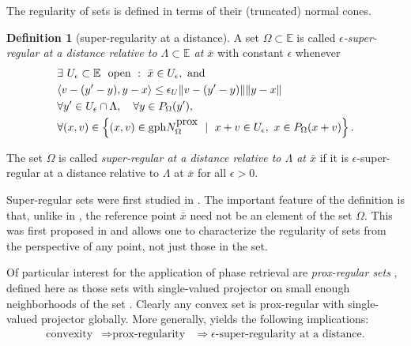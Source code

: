 \documentclass[12pt]{article}
\theoremstyle{definition}
\newtheorem{definition}{Definition}
\renewcommand{\equiv}{:=}
\newcommand{\Ebb}{\mathbb{E}}
\newcommand{\gph}{\mathrm{gph} }
\newcommand{\pncone}[1]{N^{\mbox{\rm prox}}_{#1}} %
\begin{document}
 	 The regularity of sets is defined in terms of their (truncated) normal cones.
\begin{definition}[super-regularity at a distance]\label{definition: super-reg+}
	A set $\Omega\subset \Ebb$ is called {\em $\epsilon$-super-regular at a distance relative
	to $\Lambda\subset \Ebb$ at $\bar x$} with constant $\epsilon$ whenever	\begin{align}\label{eq:ele.subreg}
    &\exists ~U_\epsilon\subset\mathbb{E}~\mbox{ open}~ :~ \bar x\in U_\epsilon,\mbox{ and }\\
    & \langle{v - (y'-y),y - x\rangle}\leq
    \epsilon_U\|v - (y'-y)\|\|y - x\|\\
    &\forall y'\in U_\epsilon\cap \Lambda, \quad \forall y\in P_\Omega(y'),\\
    & \forall (x,v)\in\left\{(x,v)\in \gph \pncone {\Omega}~\mid~x+v\in U_\epsilon,~x\in P_\Omega(x+v)\right\}.
    \end{align}
	
	The set $\Omega$ is called {\em super-regular at a distance relative
	to $\Lambda$ at $\bar x$} if it is $\epsilon$-super-regular at a distance relative
	to $\Lambda$ at $\bar x$ for all $\epsilon>0$.
\end{definition}
Super-regular sets were first studied in \cite{lewis2009local}.
The important feature of the definition is that, unlike in \cite{lewis2009local},
the reference point $\bar x$ need not be an element
of the set $\Omega$.  This was first proposed in \cite{luke2020convergence}
and allows one to characterize the regularity of sets from the perspective
of any point, not just those in the set.


Of particular interest for the application of phase retrieval are {\em prox-regular sets} \cite[Definition 1.1]{poliquin2000local}, defined here as those sets with single-valued projector on small enough neighborhoods of the set \cite[Theorem 1.3(a) and (k)]{poliquin2000local}. Clearly any convex set is prox-regular with single-valued projector globally.
More generally, \cite[Proposition 3.1]{russell2018quantitative} yields the following implications:
\begin{equation*}%
\begin{array}{ccc}
\mbox{convexity}&\Rightarrow      \mbox{prox-regularity} &\Rightarrow \epsilon\mbox{-super-regularity at a distance}.
\end{array}
\end{equation*}
\end{document}
